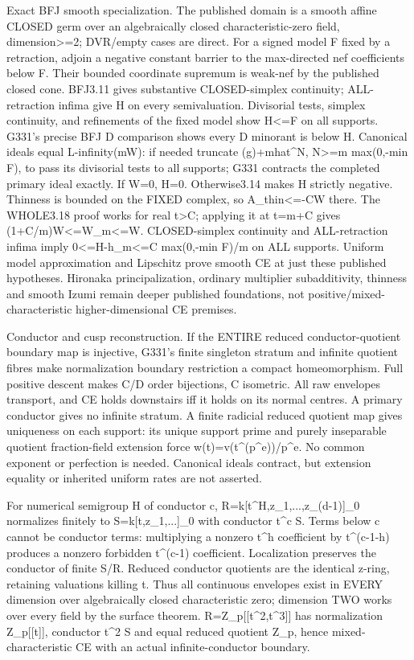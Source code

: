 Exact BFJ smooth specialization. The published domain is a smooth affine CLOSED germ over an algebraically closed characteristic-zero field, dimension\textgreater{}=2; DVR/empty cases are direct. For a signed model F fixed by a retraction, adjoin a negative constant barrier to the max-directed nef coefficients below F. Their bounded coordinate supremum is weak-nef by the published closed cone. BFJ3.11 gives substantive CLOSED-simplex continuity; ALL-retraction infima give H on every semivaluation. Divisorial tests, simplex continuity, and refinements of the fixed model show H\textless{}=F on all supports. G331's precise BFJ D comparison shows every D minorant is below H. Canonical ideals equal L-infinity(mW): if needed truncate (g)+mhat\textasciicircum{}N, N\textgreater{}=m max(0,-min F), to pass its divisorial tests to all supports; G331 contracts the completed primary ideal exactly. If W=0, H=0. Otherwise3.14 makes H strictly negative. Thinness is bounded on the FIXED complex, so A\_thin\textless{}=-CW there. The WHOLE3.18 proof works for real t\textgreater{}C; applying it at t=m+C gives (1+C/m)W\textless{}=W\_m\textless{}=W. CLOSED-simplex continuity and ALL-retraction infima imply 0\textless{}=H-h\_m\textless{}=C max(0,-min F)/m on ALL supports. Uniform model approximation and Lipschitz prove smooth CE at just these published hypotheses. Hironaka principalization, ordinary multiplier subadditivity, thinness and smooth Izumi remain deeper published foundations, not positive/mixed-characteristic higher-dimensional CE premises.

Conductor and cusp reconstruction. If the ENTIRE reduced conductor-quotient boundary map is injective, G331's finite singleton stratum and infinite quotient fibres make normalization boundary restriction a compact homeomorphism. Full positive descent makes C/D order bijections, C isometric. All raw envelopes transport, and CE holds downstairs iff it holds on its normal centres. A primary conductor gives no infinite stratum. A finite radicial reduced quotient map gives uniqueness on each support: its unique support prime and purely inseparable quotient fraction-field extension force w(t)=v(t\textasciicircum{}(p\textasciicircum{}e))/p\textasciicircum{}e. No common exponent or perfection is needed. Canonical ideals contract, but extension equality or inherited uniform rates are not asserted.

For numerical semigroup H of conductor c, R=k[t\textasciicircum{}H,z\_1,...,z\_(d-1)]\_0 normalizes finitely to S=k[t,z\_1,...]\_0 with conductor t\textasciicircum{}c S. Terms below c cannot be conductor terms: multiplying a nonzero t\textasciicircum{}h coefficient by t\textasciicircum{}(c-1-h) produces a nonzero forbidden t\textasciicircum{}(c-1) coefficient. Localization preserves the conductor of finite S/R. Reduced conductor quotients are the identical z-ring, retaining valuations killing t. Thus all continuous envelopes exist in EVERY dimension over algebraically closed characteristic zero; dimension TWO works over every field by the surface theorem. R=Z\_p[[t\textasciicircum{}2,t\textasciicircum{}3]] has normalization Z\_p[[t]], conductor t\textasciicircum{}2 S and equal reduced quotient Z\_p, hence mixed-characteristic CE with an actual infinite-conductor boundary.


